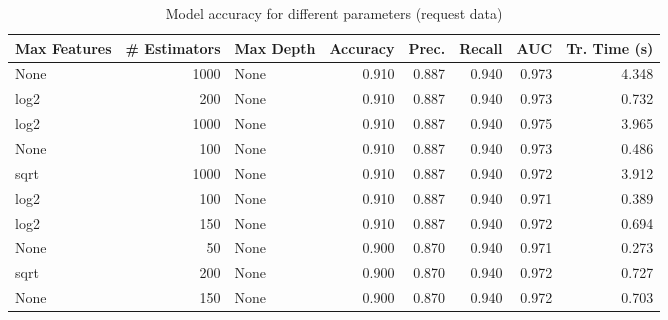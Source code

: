 \documentclass[
    fontsize=12pt,
    headings=small,
    parskip=half,           %
    bibliography=totoc,
    numbers=noenddot,       %
    open=any,               %
    final,                   %
    table
]{scrreprt}
\begin{document}
\begin{table}[H]
    \begin{center}
        \begin{tabular}{lrlrrrrr}
            \toprule Max Features & \# Estimators & Max Depth & Accuracy & Prec. & Recall & AUC & Tr. Time (s) \\
            \midrule
            None & 1000 & None & 0.910 & 0.887 & 0.940 & 0.973 & 4.348 \\
            log2 & 200 & None & 0.910 & 0.887 & 0.940 & 0.973 & 0.732 \\
            log2 & 1000 & None & 0.910 & 0.887 & 0.940 & 0.975 & 3.965 \\
            \rowcolor{green!30}
            None & 100 & None & 0.910 & 0.887 & 0.940 & 0.973 & 0.486 \\
            sqrt & 1000 & None & 0.910 & 0.887 & 0.940 & 0.972 & 3.912 \\
            log2 & 100 & None & 0.910 & 0.887 & 0.940 & 0.971 & 0.389 \\
            log2 & 150 & None & 0.910 & 0.887 & 0.940 & 0.972 & 0.694 \\
            None & 50 & None & 0.900 & 0.870 & 0.940 & 0.971 & 0.273 \\
            sqrt & 200 & None & 0.900 & 0.870 & 0.940 & 0.972 & 0.727 \\
            None & 150 & None & 0.900 & 0.870 & 0.940 & 0.972 & 0.703 \\
            \bottomrule
        \end{tabular}
    \end{center}
    \caption{Model accuracy for different parameters (request data)}
    \label{table:request_params}
\end{table}
\end{document}
